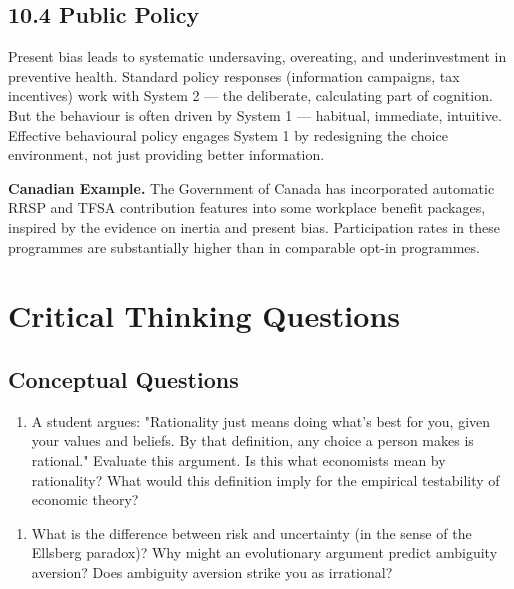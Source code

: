 \documentclass[12pt, letterpaper]{article}
\begin{document}
\subsection{10.4 Public Policy}


Present bias leads to systematic undersaving, overeating, and underinvestment in preventive health. Standard policy responses (information campaigns, tax incentives) work with System 2 --- the deliberate, calculating part of cognition. But the behaviour is often driven by System 1 --- habitual, immediate, intuitive. Effective behavioural policy engages System 1 by redesigning the choice environment, not just providing better information.

\textbf{Canadian Example.} The Government of Canada has incorporated automatic RRSP and TFSA contribution features into some workplace benefit packages, inspired by the evidence on inertia and present bias. Participation rates in these programmes are substantially higher than in comparable opt-in programmes.

\medskip


\section*{Critical Thinking Questions}



\subsection{Conceptual Questions}


\begin{enumerate}
\item A student argues: "Rationality just means doing what's best for you, given your values and beliefs. By that definition, any choice a person makes is rational." Evaluate this argument. Is this what economists mean by rationality? What would this definition imply for the empirical testability of economic theory?
\end{enumerate}

\begin{enumerate}
\item What is the difference between risk and uncertainty (in the sense of the Ellsberg paradox)? Why might an evolutionary argument predict ambiguity aversion? Does ambiguity aversion strike you as irrational?
\end{enumerate}
\end{document}
